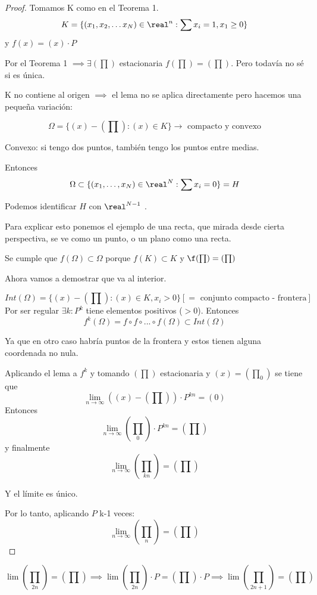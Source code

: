\begin{proof}
	Tomamos K como en el Teorema 1.
		$$K = \{(x_1 , x_2, \ldots x_N) \in \real^n : \sum x_i = 1 , x_1 \geq 0\}$$
	y $f(x) = (x)\cdot P$

	Por el Teorema 1 $\implies \exists (\prod)$ estacionaria $f(\prod) = (\prod)$. Pero todavía no sé si es única.

	\obs K no contiene al origen $\implies$ el lema no se aplica directamente pero hacemos una pequeña variación:

	$$\Omega = \{(x) - (\prod) : (x) \in K\} \rightarrow \text{ compacto y convexo}$$

	Convexo: si tengo dos puntos, también tengo los puntos entre medias.


	Entonces
	$$\Omega \subset \{(x_1 , \ldots , x_N) \in \real^N : \sum x_i = 0\} = H$$

	Podemos identificar $H$ con $\real^{N-1}$ .

	Para explicar esto ponemos el ejemplo de una recta, que mirada desde cierta perspectiva, se ve como un punto, o un plano como una recta.

	Se cumple que $f(\Omega) \subset \Omega$ porque $f(K) \subset K$ y $\f(\prod) = (\prod)$

	Ahora vamos a demostrar que va al interior.

	$$Int(\Omega) = \{(x) - (\prod) : (x) \in K, x_i >0\} [ = \text{ conjunto compacto - frontera}]$$
Por ser regular $\exists k : P^k$ tiene elementos positivos ($>0$). Entonces
$$f^k(\Omega) = f \circ f\circ . . . \circ f(\Omega) \subset Int(\Omega)$$

Ya que en otro caso habría puntos de la frontera y estos tienen alguna coordenada no nula.

Aplicando el lema a $f^k$ y tomando $(\prod)$ estacionaria y $(x) = (\prod_0)$ se tiene que
$$\lim_{n \rightarrow \infty} ((x) - (\prod)) \cdot P^{kn} = (0)$$
Entonces
$$\lim_{n \rightarrow \infty} (\prod_0) \cdot P^{kn} = (\prod)$$
y finalmente
$$\lim_{n \rightarrow \infty} (\prod_{kn}) = (\prod)$$

Y el límite es único.

Por lo tanto, aplicando $P$ k-1 veces:
$$\lim_{n \rightarrow \infty} (\prod_{n}) = (\prod)$$
\end{proof}

\begin{example}
	$$\lim(\prod_{2n}) = (\prod) \implies \lim (\prod_{2n})\cdot P = (\prod)\cdot P \implies \lim(\prod_{2n +1}) = (\prod)$$
\end{example}


